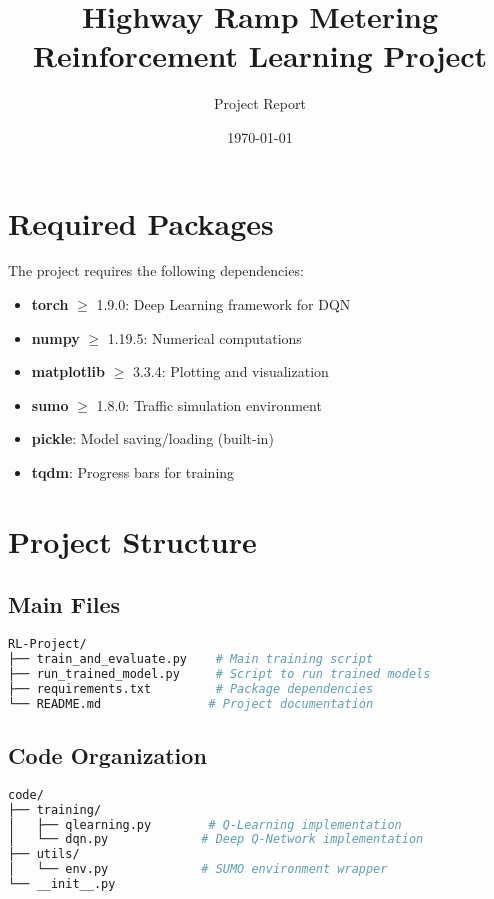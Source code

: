 \documentclass[12pt,a4paper]{article}
\title{Highway Ramp Metering Reinforcement Learning Project}
\author{Project Report}
\date{\today}
\begin{document}
\maketitle
\tableofcontents
\newpage

\section{Required Packages}
The project requires the following dependencies:

\begin{tcolorbox}[title=Core Dependencies]
\begin{itemize}
    \item \textbf{torch} $\geq$ 1.9.0: Deep Learning framework for DQN
    \item \textbf{numpy} $\geq$ 1.19.5: Numerical computations
    \item \textbf{matplotlib} $\geq$ 3.3.4: Plotting and visualization
    \item \textbf{sumo} $\geq$ 1.8.0: Traffic simulation environment
    \item \textbf{pickle}: Model saving/loading (built-in)
\end{itemize}
\end{tcolorbox}

\begin{tcolorbox}[title=Optional Dependencies]
\begin{itemize}
    \item \textbf{tqdm}: Progress bars for training
\end{itemize}
\end{tcolorbox}

\section{Project Structure}

\subsection{Main Files}
\begin{lstlisting}[language=bash]
RL-Project/
├── train_and_evaluate.py    # Main training script
├── run_trained_model.py     # Script to run trained models
├── requirements.txt         # Package dependencies
└── README.md               # Project documentation
\end{lstlisting}

\subsection{Code Organization}
\begin{lstlisting}[language=bash]
code/
├── training/
│   ├── qlearning.py        # Q-Learning implementation
│   └── dqn.py             # Deep Q-Network implementation
├── utils/
│   └── env.py             # SUMO environment wrapper
└── __init__.py
\end{lstlisting}
\end{document}
